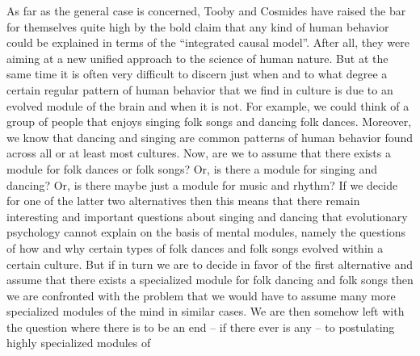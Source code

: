 As far as the general case is concerned, Tooby and Cosmides have raised the
bar for themselves quite high by the bold claim that any kind of human
behavior could be explained in terms of the ``integrated causal model''.
After all, they were aiming at a new unified approach to the science of human
nature. But at the same time it is often very difficult to discern just when
and to what degree a certain regular pattern of human behavior that we find
in culture is due to an evolved module of the brain and when it is not. For
example, we could think of a group of people that enjoys singing folk songs
and dancing folk dances. Moreover, we know that dancing and singing are common
patterns of human behavior found across all or at least most cultures. Now,
are we to assume that there exists a module for folk dances or folk songs? Or,
is there a module for singing and dancing? Or, is there maybe just a module
for music and rhythm? If we decide for one of the latter two alternatives then
this means that there remain interesting and important questions about singing
and dancing that evolutionary psychology cannot explain on the basis of mental
modules, namely the questions of how and why certain types of folk dances and
folk songs evolved within a certain culture. But if in turn we are to decide
in favor of the first alternative and assume that there exists a specialized
module for folk dancing and folk songs then we are confronted with the problem
that we would have to assume many more specialized modules of the mind in
similar cases. We are then somehow left with the question where there is to be
an end -- if there ever is any -- to postulating highly specialized modules of
